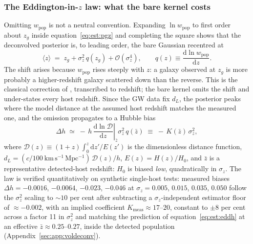 \subsubsection{The Eddington-in-$z$ law: what the bare kernel costs}
\label{sec:est:eddz}

Omitting $w_\mathrm{pop}$ is not a neutral convention. Expanding $\ln w_\mathrm{pop}$ to first order about $z_g$ inside equation~\eqref{eq:est:pgz} and completing the square shows that the deconvolved posterior is, to leading order, the bare Gaussian recentred at
\begin{equation}
  \langle z \rangle \;=\; z_g + \sigma_z^2\, q(z_g) + \mathcal{O}(\sigma_z^4),
  \qquad
  q(z) \equiv \frac{\mathrm{d} \ln w_\mathrm{pop}}{\mathrm{d}z}.
  \label{eq:est:eddz}
\end{equation}
The shift arises because $w_\mathrm{pop}$ rises steeply with $z$: a galaxy observed at $z_g$ is more probably a higher-redshift galaxy scattered down than the reverse. This is the classical correction of \citet{Eddington1913}, transcribed to redshift;
the bare kernel omits the shift and under-states every host redshift. Since the GW data fix $d_L$, the posterior peaks where the model distance at the assumed host redshift matches the measured one, and the omission propagates to a Hubble bias
\begin{equation}
  \Delta h \;\simeq\; -\,h\,
  \left.\frac{\mathrm{d}\ln \mathcal{D}}{\mathrm{d}z}\right|_{\bar z}
  \sigma_z^2\, q(\bar z)
  \;\equiv\; -\,K(\bar z)\,\sigma_z^2,
  \label{eq:est:eddh}
\end{equation}
where $\mathcal{D}(z) \equiv (1+z)\int_0^z \mathrm{d}z'/E(z')$ is the dimensionless distance function, $d_L = (c/100~\mathrm{km\,s^{-1}\,Mpc^{-1}})\,\mathcal{D}(z)/h$, $E(z) = H(z)/H_0$, and $\bar z$ is a representative detected-host redshift: $H_0$ is biased \emph{low}, quadratically in $\sigma_z$. The law is verified quantitatively on synthetic single-host tests: measured biases $\Delta h = -0.0016$, $-0.0064$, $-0.023$, $-0.046$ at $\sigma_z = 0.005$, $0.015$, $0.035$, $0.050$ follow the $\sigma_z^2$ scaling to ${\sim}10$ per cent after subtracting a $\sigma_z$-independent estimator floor of $\approx -0.002$, with an implied coefficient $K_\mathrm{meas} \approx 17$--$20$, constant to $\pm 8$ per cent across a factor 11 in $\sigma_z^2$ and matching the prediction of equation~\eqref{eq:est:eddh} at an effective $\bar z \approx 0.25$--$0.27$, inside the detected population (Appendix~\ref{sec:app:voldeconv}). %

